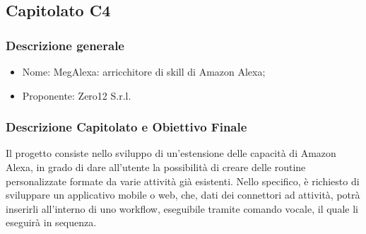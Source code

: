 \subsection{Capitolato C4}\label{C4}

\subsubsection{Descrizione generale}
\begin{itemize}
	\item Nome: MegAlexa: arricchitore di skill di Amazon Alexa;
	\item Proponente: Zero12 S.r.l.
\end{itemize}

\subsubsection{Descrizione Capitolato e Obiettivo Finale}
Il progetto consiste nello sviluppo di un'estensione delle capacità di Amazon Alexa\glossario, in grado di dare all'utente la possibilità di creare delle routine personalizzate formate da varie attività già esistenti.
Nello specifico, è richiesto di sviluppare un applicativo mobile o web, che, dati dei connettori ad attività, potrà inserirli all'interno di uno workflow, eseguibile tramite comando vocale, il quale li eseguirà in sequenza.

